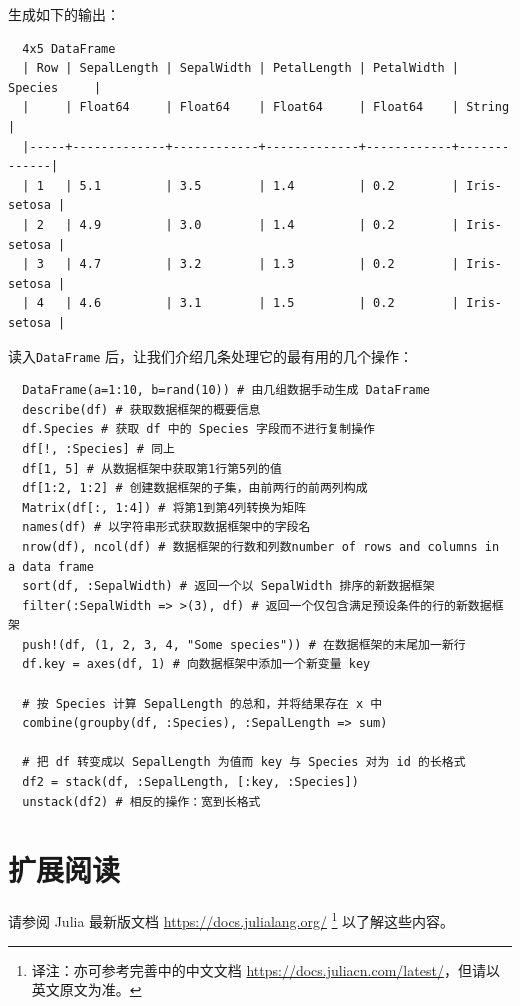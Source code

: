 \documentclass[10pt,a4paper]{article}
\begin{document}
生成如下的输出：
\begin{lstlisting}
  4x5 DataFrame
  | Row | SepalLength | SepalWidth | PetalLength | PetalWidth | Species     |
  |     | Float64     | Float64    | Float64     | Float64    | String      |
  |-----+-------------+------------+-------------+------------+-------------|
  | 1   | 5.1         | 3.5        | 1.4         | 0.2        | Iris-setosa |
  | 2   | 4.9         | 3.0        | 1.4         | 0.2        | Iris-setosa |
  | 3   | 4.7         | 3.2        | 1.3         | 0.2        | Iris-setosa |
  | 4   | 4.6         | 3.1        | 1.5         | 0.2        | Iris-setosa |
\end{lstlisting}

读入\lstinline|DataFrame| 后，让我们介绍几条处理它的最有用的几个操作：
\begin{lstlisting}
  DataFrame(a=1:10, b=rand(10)) # 由几组数据手动生成 DataFrame
  describe(df) # 获取数据框架的概要信息
  df.Species # 获取 df 中的 Species 字段而不进行复制操作
  df[!, :Species] # 同上
  df[1, 5] # 从数据框架中获取第1行第5列的值
  df[1:2, 1:2] # 创建数据框架的子集，由前两行的前两列构成
  Matrix(df[:, 1:4]) # 将第1到第4列转换为矩阵
  names(df) # 以字符串形式获取数据框架中的字段名
  nrow(df), ncol(df) # 数据框架的行数和列数number of rows and columns in a data frame
  sort(df, :SepalWidth) # 返回一个以 SepalWidth 排序的新数据框架
  filter(:SepalWidth => >(3), df) # 返回一个仅包含满足预设条件的行的新数据框架
  push!(df, (1, 2, 3, 4, "Some species")) # 在数据框架的末尾加一新行
  df.key = axes(df, 1) # 向数据框架中添加一个新变量 key

  # 按 Species 计算 SepalLength 的总和，并将结果存在 x 中
  combine(groupby(df, :Species), :SepalLength => sum)

  # 把 df 转变成以 SepalLength 为值而 key 与 Species 对为 id 的长格式
  df2 = stack(df, :SepalLength, [:key, :Species])
  unstack(df2) # 相反的操作：宽到长格式
\end{lstlisting}


\section{扩展阅读}
\label{sec:readmore}

请参阅 Julia 最新版文档 \url{https://docs.julialang.org/} 
\footnote{译注：亦可参考完善中的中文文档 \url{https://docs.juliacn.com/latest/}，但请以英文原文为准。} 以了解这些内容。
\end{document}
